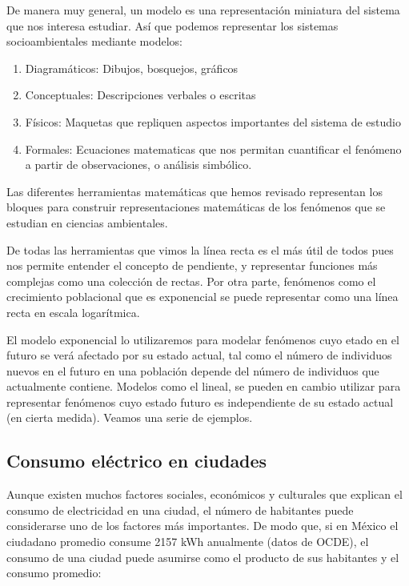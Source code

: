 \documentclass[
]{book}
\providecommand{\tightlist}{%
  \setlength{\itemsep}{0pt}\setlength{\parskip}{0pt}}
\begin{document}
De manera muy general, un modelo es una representación miniatura del sistema que nos interesa estudiar. Así que podemos representar los sistemas socioambientales mediante modelos:

\begin{enumerate}
\def\labelenumi{\arabic{enumi}.}
\tightlist
\item
  Diagramáticos: Dibujos, bosquejos, gráficos
\item
  Conceptuales: Descripciones verbales o escritas
\item
  Físicos: Maquetas que repliquen aspectos importantes del sistema de estudio
\item
  Formales: Ecuaciones matematicas que nos permitan cuantificar el fenómeno a partir de observaciones, o análisis simbólico.
\end{enumerate}

Las diferentes herramientas matemáticas que hemos revisado representan los bloques para construir representaciones matemáticas de los fenómenos que se estudian en ciencias ambientales.

De todas las herramientas que vimos la línea recta es el más útil de todos pues nos permite entender el concepto de pendiente, y representar funciones más complejas como una colección de rectas. Por otra parte, fenómenos como el crecimiento poblacional que es exponencial se puede representar como una línea recta en escala logarítmica.

El modelo exponencial lo utilizaremos para modelar fenómenos cuyo etado en el futuro se verá afectado por su estado actual, tal como el número de individuos nuevos en el futuro en una población depende del número de individuos que actualmente contiene. Modelos como el lineal, se pueden en cambio utilizar para representar fenómenos cuyo estado futuro es independiente de su estado actual (en cierta medida). Veamos una serie de ejemplos.

\hypertarget{consumo-eluxe9ctrico-en-ciudades}{%
\subsection{Consumo eléctrico en ciudades}\label{consumo-eluxe9ctrico-en-ciudades}}

Aunque existen muchos factores sociales, económicos y culturales que explican el consumo de electricidad en una ciudad, el número de habitantes puede considerarse uno de los factores más importantes. De modo que, si en México el ciudadano promedio consume 2157 kWh anualmente (datos de OCDE), el consumo de una ciudad puede asumirse como el producto de sus habitantes y el consumo promedio:
\end{document}
